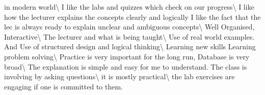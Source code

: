 \documentclass[
]{article}
\begin{document}
in modern world\textbackslash{} \hline I like the labs and quizzes which
check on our progress\textbackslash{} \hline I like how the lecturer
explains the concepts clearly and logically I like the fact that the lec
is always ready to explain unclear and ambiguous
concepts\textbackslash{} \hline Well Organised,
Interactive\textbackslash{} \hline The lecturer and what is being
taught\textbackslash{} \hline Use of real world examples. And Use of
structured design and logical thinking\textbackslash{} \hline Learning
new skills Learning problem solving\textbackslash{} \hline Practice is
very important for the long run, Database is very broad\textbackslash{}
\hline The explanation is simple and easy for me to understand. The
class is involving by asking questions\textbackslash{} \hline it is
mostly practical\textbackslash{} \hline the lab exercises are engaging
if one is committed to them.
\end{document}
